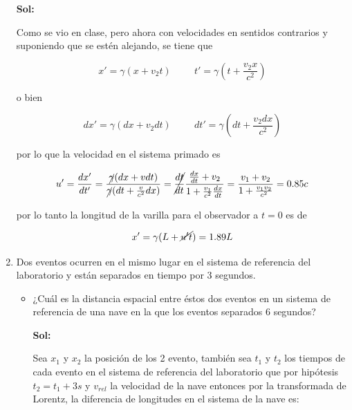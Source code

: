 \documentclass[12pt,a4paper]{article}
\begin{document}
\begin{enumerate}
\textbf{Sol:}

Como se vio en clase, pero ahora con velocidades en sentidos contrarios y suponiendo que se estén alejando, se tiene que

\begin{equation*}
    x' = \gamma (x + v_2 t) \hspace{1cm} t' = \gamma (t + \frac{v_2x}{c^2})
\end{equation*}

o bien

\begin{equation*}
    dx' = \gamma (dx + v_2 dt) \hspace{1cm} dt' = \gamma (dt + \frac{v_2dx}{c^2})
\end{equation*}

por lo que la velocidad en el sistema primado es

\begin{equation}
    u' = \frac{dx'}{dt'} =\frac{\cancel{\gamma}(dx+vdt)}{\cancel{\gamma}(dt+\frac{v}{c^2}dx)} = \cancel{\frac{dt}{dt}} \frac{\frac{dx}{dt} + v_2}{1 + \frac{v_1 }{c^2} \frac{dx}{dt}}= \frac{v_1+v_2}{1+\frac{v_1 v_2}{c^2}} = 0.85 c
\end{equation}

por lo tanto la longitud de la varilla para el observador a $t=0$ es de

\begin{equation*}
    x' = \gamma (L+\cancel{u't})=  1.89 L 
\end{equation*}






\item Dos eventos ocurren en el mismo lugar en el sistema de referencia del laboratorio y están separados en tiempo por 3 segundos.

\begin{itemize}
    \item ¿Cuál es la distancia espacial entre éstos dos eventos en un sistema de referencia de una nave en la que los eventos separados 6 segundos?
    
    \textbf{Sol:}
    
    Sea $x_1$ y $x_2$ la posición de los 2 evento, también sea $t_1$ y $t_2$ los tiempos de cada evento en el sistema de referencia del laboratorio que por hipótesis $t_2 = t_1 +3s$ y $v_{rel}$ la velocidad de la nave entonces por la transformada de Lorentz, la diferencia de longitudes en el sistema de la nave es:
    

\end{itemize}
\end{enumerate}
\end{document}
